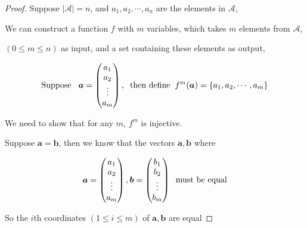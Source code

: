 \documentclass[12pt]{article}
\renewcommand{\vec}[1]{\boldsymbol{#1}}
\begin{document}
\begin{proof}
    Suppose $\vert \mathcal{A} \vert = n$, and $a_1, a_2, \cdots, a_n$ are the elements in $\mathcal{A}$, 

    \vspace*{0.3cm}
    \hspace*{1cm}
    We can construct a function $f$ with $m$ variables, which takes $m$ elements from
    $\mathcal{A}$, 
    
    \vspace*{0.3cm}
    \hspace*{1cm}
    $(0 \leq m \leq n)$ as input, and a set containing these elements as output, 

    \[ \text{Suppose} \hspace*{0.3cm} \vec a = \begin{pmatrix}
        a_1 \\
        a_2 \\
        \vdots \\
        a_m
    \end{pmatrix} , \hspace*{0.2cm} \text{then define} \hspace*{0.2cm} 
    f^{m}(\vec{a}) = \lbrace a_1, a_2, \cdots, a_m \rbrace \]

    \vspace*{0.3cm}
    \hspace*{1cm}
    We need to show that for any $m$, $f^m$ is injective.

    \vspace*{0.3cm}
    \hspace*{1cm}
    Suppose $\vec{a} = \vec{b}$, then we know that the vectors $\vec{a},\vec{b}$ where

    \[ \vec a = \begin{pmatrix}
        a_1 \\
        a_2 \\
        \vdots \\
        a_m
    \end{pmatrix} , \vec b = \begin{pmatrix}
        b_1 \\
        b_2 \\
        \vdots \\
        b_m
    \end{pmatrix} \hspace*{0.2cm} \text{must be equal}\]

    \vspace*{0.3cm}
    \hspace*{1cm}
    So the $i$th coordinates $( 1 \leq i \leq m)$ of $\vec a,\vec b$ are equal


\end{proof}
\end{document}

